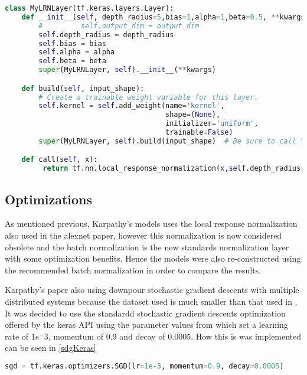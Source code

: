 \begin{lstlisting}[language=Python, caption=Local response normalization layer implemetation, label=lrn]
class MyLRNLayer(tf.keras.layers.Layer):
    def __init__(self, depth_radius=5,bias=1,alpha=1,beta=0.5, **kwargs):
        #         self.output_dim = output_dim
        self.depth_radius = depth_radius
        self.bias = bias
        self.alpha = alpha
        self.beta = beta
        super(MyLRNLayer, self).__init__(**kwargs)

    def build(self, input_shape):
        # Create a trainable weight variable for this layer.
        self.kernel = self.add_weight(name='kernel',
                                      shape=(None),
                                      initializer='uniform',
                                      trainable=False)
        super(MyLRNLayer, self).build(input_shape)  # Be sure to call this at the end

    def call(self, x):
         return tf.nn.local_response_normalization(x,self.depth_radius,self.bias,self.alpha,self.beta)
\end{lstlisting}


    \subsection{Optimizations}

    As mentioned previous, Karpathy's models uses the local response normalization \cite{ROBINSON20071631} also used in the alexnet paper\cite{NIPS2012_4824}, however this normalization is now considered obsolete and the batch normalization \cite{ioffe2015batch} is the new standards normalization layer with some optimization benefits. Hence the models were also re-constructed using the recommended batch normalization in order to compare the results.  
    
    Karpathy's paper also using downpour stochastic gradient descents with multiple distributed systems because the dataset used is much smaller than that used in \citep{KarpathyCVPR14}. It was decided to use the standardd stochastic gradient descents optimization offered by the keras API using the parameter values from \citep{KarpathyCVPR14} which set a learning rate of $1e^-3$, momentum of 0.9 and decay of $0.0005$. How this is was implemented can be seen in \ref{sdgKeras} 
    
    \begin{lstlisting}[language=Python, caption=Keras SGD optimization, label=sdgKeras]
    sgd = tf.keras.optimizers.SGD(lr=1e-3, momentum=0.9, decay=0.0005)
    \end{lstlisting}
    
